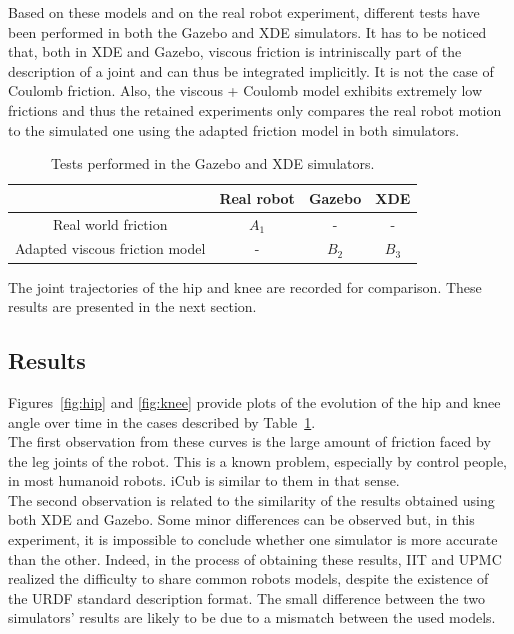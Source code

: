 \documentclass[12pt,a4paper,twoside]{article}
\begin{document}
Based on these models and on the real robot experiment, different tests have been performed in both the Gazebo and XDE simulators. It has to be noticed that, both in XDE and Gazebo, viscous friction is intriniscally part of the description of a joint and can thus be integrated implicitly. It is not the case of Coulomb friction. Also, the viscous + Coulomb model exhibits extremely low frictions and thus the retained experiments only compares the real robot motion to the simulated one using the adapted friction model in both simulators.\\

\begin{table}[h]
\begin{center}
\begin{tabular}{|c|c|c|c|}
\cline{2-4} 
\multicolumn{1}{c|}{} & Real robot & Gazebo & XDE\tabularnewline
\hline 
Real world friction & $A_1$ & - & -\tabularnewline
\hline 
Adapted viscous friction model & - & $B_2$ & $B_3$\tabularnewline
\hline 
\end{tabular}
\caption{Tests performed in the Gazebo and XDE simulators.}
\label{tab:simulator-tests}
\end{center}	
\end{table}

The joint trajectories of the hip and knee are recorded for comparison. These results are presented in the next section.

\subsection{Results}

Figures~\ref{fig:hip} and \ref{fig:knee} provide plots of the evolution of the hip and knee angle over time in the cases described by Table~\ref{tab:simulator-tests}.\\

The first observation from these curves is the large amount of friction faced by the leg joints of the robot. This is a known problem, especially by control people, in most humanoid robots. iCub is similar to them in that sense.\\

The second observation is related to the similarity of the results obtained using both XDE and Gazebo. Some minor differences can be observed but, in this experiment, it is impossible to conclude whether one simulator is more accurate than the other. Indeed, in the process of obtaining these results, IIT and UPMC realized the difficulty to share common robots models, despite the existence of the URDF standard description format. The small difference between the two simulators' results are likely to be due to a mismatch between the used models.\\
\end{document}
